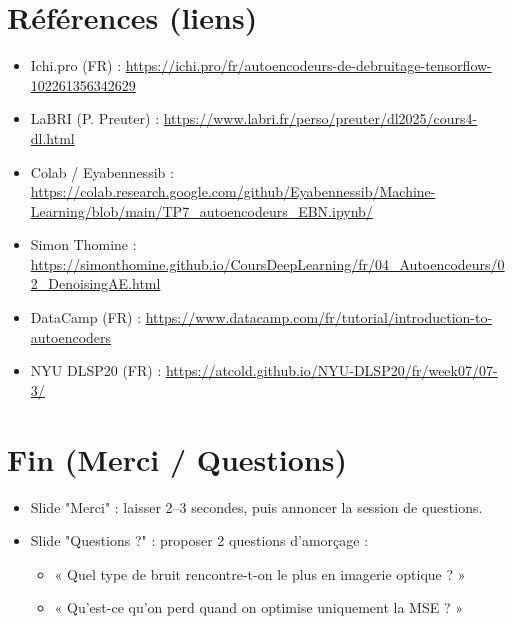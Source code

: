 \documentclass[11pt,a4paper]{article}
\begin{document}
\section{Références (liens)}
\begin{itemize}
  \item Ichi.pro (FR) : \url{https://ichi.pro/fr/autoencodeurs-de-debruitage-tensorflow-102261356342629}
  \item LaBRI (P. Preuter) : \url{https://www.labri.fr/perso/preuter/dl2025/cours4-dl.html}
  \item Colab / Eyabennessib : \url{https://colab.research.google.com/github/Eyabennessib/Machine-Learning/blob/main/TP7_autoencodeurs_EBN.ipynb/}
  \item Simon Thomine : \url{https://simonthomine.github.io/CoursDeepLearning/fr/04_Autoencodeurs/02_DenoisingAE.html}
  \item DataCamp (FR) : \url{https://www.datacamp.com/fr/tutorial/introduction-to-autoencoders}
  \item NYU DLSP20 (FR) : \url{https://atcold.github.io/NYU-DLSP20/fr/week07/07-3/}
\end{itemize}

\section*{Fin (Merci / Questions)}
\begin{itemize}
  \item Slide "Merci" : laisser 2--3 secondes, puis annoncer la session de questions.
  \item Slide "Questions ?" : proposer 2 questions d'amorçage :
  \begin{itemize}
    \item « Quel type de bruit rencontre-t-on le plus en imagerie optique ? »
    \item « Qu'est-ce qu'on perd quand on optimise uniquement la MSE ? »
  \end{itemize}
\end{itemize}
\end{document}
